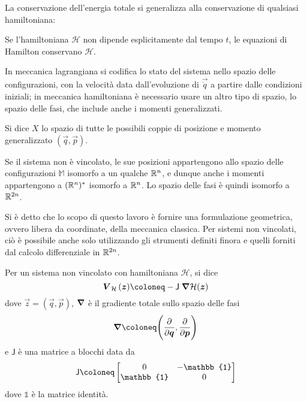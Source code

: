 La conservazione dell'energia totale si generalizza alla conservazione di qualsiasi hamiltoniana:
\begin{theorem}
  Se l'hamiltoniana $\mathcal{H}$ non dipende esplicitamente dal tempo $t$, le equazioni di Hamilton conservano $\mathcal{H}$.
\end{theorem}

In meccanica lagrangiana si codifica lo stato del sistema nello spazio delle configurazioni, con la velocità data dall'evoluzione di $\vec{\dot{q}}$ a partire dalle condizioni iniziali; in meccanica hamiltoniana è necessario usare un altro tipo di spazio, lo spazio delle fasi, che include anche i momenti generalizzati.
\begin{definition}
  Si dice  $X$ lo spazio di tutte le possibili coppie di posizione e momento generalizzato $(\vec{q},\vec{p})$.
\end{definition}
\begin{remark}
  Se il sistema non è vincolato, le sue posizioni appartengono allo spazio delle configurazioni $\mathbb{M}$ isomorfo a un qualche $\mathbb{R}^{n}$, e dunque anche i momenti appartengono a $(\mathbb{R}^{n})^*$ isomorfo a $\mathbb{R}^{n}$. Lo spazio delle fasi è quindi isomorfo a $\mathbb{R}^{2n}$.
\end{remark}

Si è detto che lo scopo di questo lavoro è fornire una formulazione geometrica, ovvero libera da coordinate, della meccanica classica. Per sistemi non vincolati, ciò è possibile anche solo utilizzando gli strumenti definiti finora e quelli forniti dal calcolo differenziale in $\mathbb{R}^{2n}$.
\begin{definition} \label{eq:hamFieldUnconstr}
  Per un sistema non vincolato con hamiltoniana $\mathcal{H}$, si dice  \begin{equation}
    \vec{V}_{\mathcal{H}}\,(\vec{z}) \defeq -\mathsf{J}\; \grad{\mathcal{H}} (\vec{z})
  \end{equation}
  dove $\vec{z}=(\vec{q},\vec{p})$, $\grad$ è il gradiente totale sullo spazio delle fasi \begin{equation}
    \grad \defeq \Bigg(\pdv{\vec{q}},\pdv{\vec{p}}\Bigg) 
    \end{equation}
    e $\mathsf{J}$ è una matrice a blocchi data da \begin{equation}
    \mathsf{J} \defeq \bmqty{0 & -\mathbb{1} \\ \mathbb{1} & 0}
    \end{equation}
    dove $\mathbb{1}$ è la matrice identità.
\end{definition}

